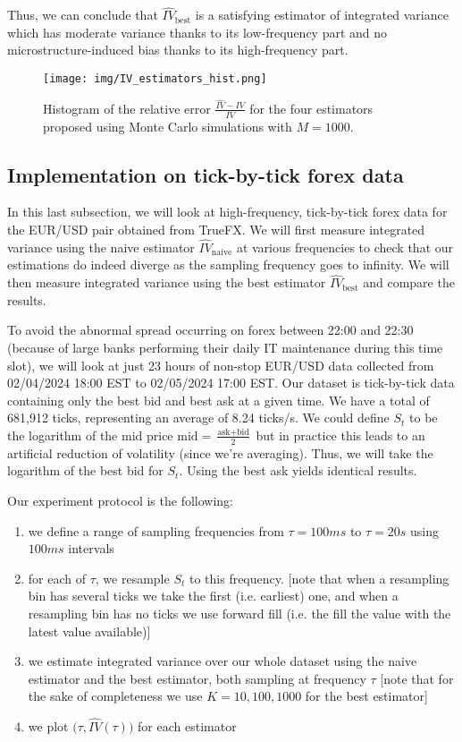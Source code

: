 \documentclass[a4paper,12pt,twoside]{article}
\begin{document}
Thus, we can conclude that $\hat{IV}_\text{best}$ is a satisfying estimator of integrated variance which has moderate variance thanks to its low-frequency part and no microstructure-induced bias thanks to its high-frequency part.

\begin{figure}[h]
    \centering
    \texttt{[image: img/IV\_estimators\_hist.png]}
    \caption{Histogram of the relative error $\frac{\hat{IV}-IV}{IV}$ for the four estimators proposed using Monte Carlo simulations with $M=1000$.}
    \label{fig-hists}
\end{figure}

\subsection{Implementation on tick-by-tick forex data}
In this last subsection, we will look at high-frequency, tick-by-tick forex data for the EUR/USD pair obtained from TrueFX. We will first measure integrated variance using the naive estimator $\hat{IV}_\text{naive}$ at various frequencies to check that our estimations do indeed diverge as the sampling frequency goes to infinity. We will then measure integrated variance using the best estimator $\hat{IV}_\text{best}$ and compare the results.

To avoid the abnormal spread occurring on forex between 22:00 and 22:30 (because of large banks performing their daily IT maintenance during this time slot), we will look at just 23 hours of non-stop EUR/USD data collected from 02/04/2024 18:00 EST to 02/05/2024 17:00 EST. Our dataset is tick-by-tick data containing only the best bid and best ask at a given time. We have a total of 681,912 ticks, representing an average of 8.24 ticks/s. We could define $S_t$ to be the logarithm of the mid price $\text{mid}=\frac{\text{ask}+\text{bid}}{2}$ but in practice this leads to an artificial reduction of volatility (since we're averaging). Thus, we will take the logarithm of the best bid for $S_t$. Using the best ask yields identical results.

Our experiment protocol is the following:
\begin{enumerate}
    \item we define a range of sampling frequencies from $\tau=100ms$ to $\tau=20s$ using $100ms$ intervals
    \item for each of $\tau$, we resample $S_t$ to this frequency. [note that when a resampling bin has several ticks we take the first (i.e. earliest) one, and when a resampling bin has no ticks we use forward fill (i.e. the fill the value with the latest value available)]
    \item we estimate integrated variance over our whole dataset using the naive estimator and the best estimator, both sampling at frequency $\tau$ [note that for the sake of completeness we use $K=10,100,1000$ for the best estimator]
    \item we plot $\big(\tau,\hat{IV}(\tau)\big)$ for each estimator
\end{enumerate}
\end{document}
